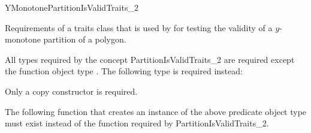 
\renewcommand\ccRefPageBegin{\ccParDims\cgalColumnLayout\begin{ccAdvanced}}
\renewcommand\ccRefPageEnd{\ccParDims\cgalColumnLayout\end{ccAdvanced}}
\begin{ccRefConcept}{YMonotonePartitionIsValidTraits_2}


\ccDefinition
  
Requirements of a traits class that is used 
by  for testing the validity of a
$y$-monotone partition of a polygon.

\ccTypes

All types required by the concept PartitionIsValidTraits\_2 are required
except the function object type . The following type is
required instead:


\ccCreation

Only a copy constructor is required.

\ccOperations

The following function that creates an instance of the above predicate object
type must exist instead of the function  required by
PartitionIsValidTraits\_2.


\ccHasModels


\ccSeeAlso

 \\

\end{ccRefConcept}
\renewcommand\ccRefPageBegin{\ccParDims\cgalColumnLayout}
\renewcommand\ccRefPageEnd{\ccParDims\cgalColumnLayout}


